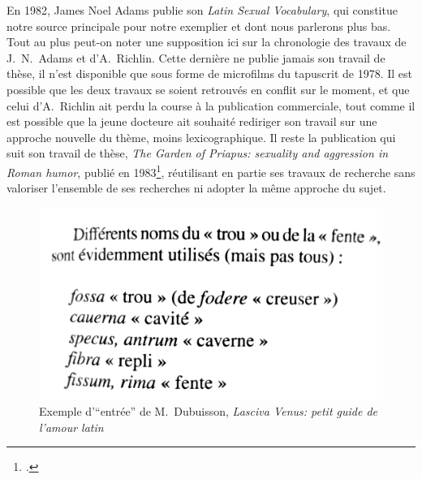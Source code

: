 En 1982, James Noel Adams publie son \textit{Latin Sexual Vocabulary}, qui constitue notre source principale pour notre exemplier et dont nous parlerons plus bas. Tout au plus peut-on noter une supposition ici sur la chronologie des travaux de J.~N.~Adams et d'A.~Richlin. Cette dernière ne publie jamais son travail de thèse, il n'est disponible que sous forme de microfilms du tapuscrit de 1978. Il est possible que les deux travaux se soient retrouvés en conflit sur le moment, et que celui d'A.~Richlin ait perdu la course à la publication commerciale, tout comme il est possible que la jeune docteure ait souhaité rediriger son travail sur une approche nouvelle du thème, moins lexicographique. Il reste la publication qui suit son travail de thèse, \textit{The Garden of Priapus: sexuality and aggression in Roman humor}, publié en 1983\footcite{amy1983garden}, réutilisant en partie ses travaux de recherche sans valoriser l'ensemble de ses recherches ni adopter la même approche du sujet.

\begin{figure}
    \centering
    \includegraphics[width=.5\linewidth]{figures/chap1/part3/37_dubuisson.png}
    \caption{Exemple d'\enquote{entrée} de M.~Dubuisson, \textit{Lasciva Venus: petit guide de l’amour latin}}
    \label{fig:cap1:dubuisson}
\end{figure}

